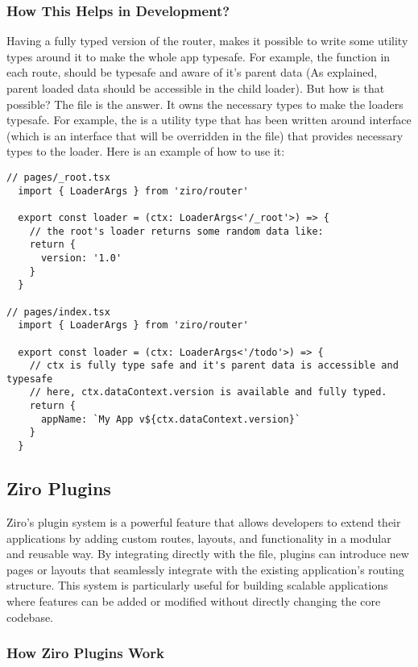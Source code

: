 \subsubsection*{How This Helps in Development?}
Having a fully typed version of the router, makes it possible to write some utility types around it to make the whole app typesafe. For example, the  function in each route, should be typesafe and aware of it's parent data (As explained, parent loaded data should be accessible in the child loader). But how is that possible? The  file is the answer. It owns the necessary types to make the loaders typesafe. For example, the  is a utility type that has been written around  interface (which is an interface that will be overridden in the  file) that provides necessary types to the loader. Here is an example of how to use it:
\begin{verbatim}
// pages/_root.tsx
  import { LoaderArgs } from 'ziro/router'

  export const loader = (ctx: LoaderArgs<'/_root'>) => {
    // the root's loader returns some random data like:
    return {
      version: '1.0'
    }
  }

// pages/index.tsx
  import { LoaderArgs } from 'ziro/router'

  export const loader = (ctx: LoaderArgs<'/todo'>) => {
    // ctx is fully type safe and it's parent data is accessible and typesafe
    // here, ctx.dataContext.version is available and fully typed.
    return {
      appName: `My App v${ctx.dataContext.version}`
    }
  }
\end{verbatim}
\pagebreak

\subsection{Ziro Plugins}

Ziro’s plugin system is a powerful feature that allows developers to extend their applications by adding custom routes, layouts, and functionality in a modular and reusable way. By integrating directly with the  file, plugins can introduce new pages or layouts that seamlessly integrate with the existing application’s routing structure. This system is particularly useful for building scalable applications where features can be added or modified without directly changing the core codebase.

\subsubsection{How Ziro Plugins Work}

